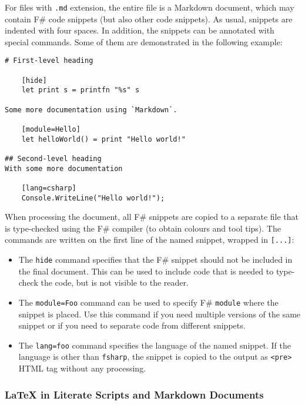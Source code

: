 \documentclass{article}
\begin{document}
For files with \texttt{.md} extension, the entire file is a Markdown document, which may
contain F\# code snippets (but also other code snippets). As usual, snippets are
indented with four spaces. In addition, the snippets can be annotated with special
commands. Some of them are demonstrated in the following example:
\begin{lstlisting}
# First-level heading

    [hide]
    let print s = printfn "%s" s

Some more documentation using `Markdown`.

    [module=Hello]
    let helloWorld() = print "Hello world!"

## Second-level heading
With some more documentation

    [lang=csharp]
    Console.WriteLine("Hello world!");

\end{lstlisting}


When processing the document, all F\# snippets are copied to a separate file that
is type-checked using the F\# compiler (to obtain colours and tool tips).
The commands are written on the first line of the named snippet, wrapped in \texttt{[...]}:
\begin{itemize}
\item 

The \texttt{hide} command specifies that the F\# snippet should not be included in the
final document. This can be used to include code that is needed to type-check
the code, but is not visible to the reader.

\item 

The \texttt{module=Foo} command can be used to specify F\# \texttt{module} where the snippet
is placed. Use this command if you need multiple versions of the same snippet
or if you need to separate code from different snippets.

\item 

The \texttt{lang=foo} command specifies the language of the named snippet. If the language
is other than \texttt{fsharp}, the snippet is copied to the output as \texttt{<pre>} HTML
tag without any processing.

\end{itemize}

\subsubsection*{LaTeX in Literate Scripts and Markdown Documents}
\end{document}
